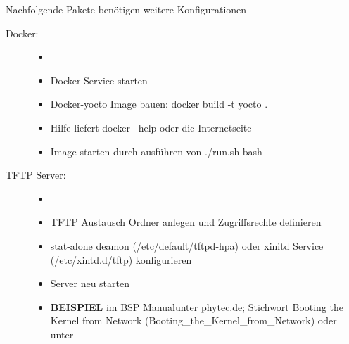 Nachfolgende Pakete benötigen weitere Konfigurationen
\begin{description}
    \item[Docker: ]
        \begin{itemize}
            \item[ ]
            \item Docker Service starten
            \item Docker-yocto Image bauen:
                \glqq docker build -t yocto . \grqq
            \item Hilfe liefert docker --help oder die Internetseite
            \item Image starten durch ausführen von \glqq ./run.sh bash \grqq
        \end{itemize}

    \item[TFTP Server:]
        \begin{itemize}
            \item[ ]
            \item TFTP Austausch Ordner anlegen und Zugriffsrechte definieren
            \item stat-alone deamon (/etc/default/tftpd-hpa) oder xinitd Service
                (/etc/xintd.d/tftp) konfigurieren
            \item Server neu starten
            \item \textbf{BEISPIEL} im \glqq BSP Manual\grqq unter  phytec.de;
                    Stichwort \glqq Booting the Kernel from Network\grqq
                (Booting\_the\_Kernel\_from\_Network) \cite{Pytec:BSP_Manual}
                oder unter \cite[S.
                44]{Gonzalez2018:Embedded_Linux_Development_Using_Yocto_Project_Cookbook_2nd}
        \end{itemize}


\end{description}
